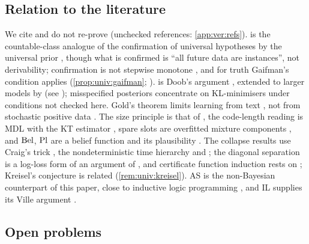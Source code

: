 \subsection{Relation to the literature}\label{sec:disc:lit}

We cite and do not re-prove (unchecked references: \cref{app:ver:refs}).  is the countable-class analogue of the confirmation of universal hypotheses by the universal prior \citep{hutter2007universal}, though what is confirmed is ``all future data are instances'', not derivability; confirmation is not stepwise monotone \citep{leike2015solomonoff}, and for truth Gaifman's condition applies (\cref{prop:univ:gaifman}; \citealp{gaifman1964concerning}).  is Doob's argument \citep{doob1949application}, extended to larger models by \citet{schwartz1965bayes} (see \citealp{ghosal2017fundamentals}); misspecified posteriors concentrate on KL-minimisers under conditions \citep{berk1966limiting,kleijn2006misspecification} not checked here. Gold's theorem limits learning from text \citep{gold1967language,angluin1980inductive}, not from stochastic positive data \citep{horning1969study,angluin1988identifying}. The size principle is that of \citet{tenenbaum2001generalization}, the code-length reading is MDL \citep{rissanen1978modeling} with the KT estimator \citep{krichevsky1981performance}, spare slots are overfitted mixture components \citep{rousseau2011asymptotic}, and $\mathrm{Bel}$, $\mathrm{Pl}$ are a belief function and its plausibility \citep{shafer1976mathematical}. The collapse results use Craig's trick \citep{craig1953axiomatizability}, the nondeterministic time hierarchy \citep{cook1972hierarchy,seiferas1978separating,zak1983turing} and \citet{pudlak1998lengths}; the diagonal separation is a log-loss form of an argument of \citet{legg2006elegant}, and certificate function induction rests on \citet{cook1979relative}; Kreisel's conjecture is related (\cref{rem:univ:kreisel}). AS is the non-Bayesian counterpart of this paper, close to inductive logic programming \citep{muggleton1991inductive}, and IL supplies its Ville argument \citep{ville1939etude}.

\subsection{Open problems}\label{sec:disc:open}

